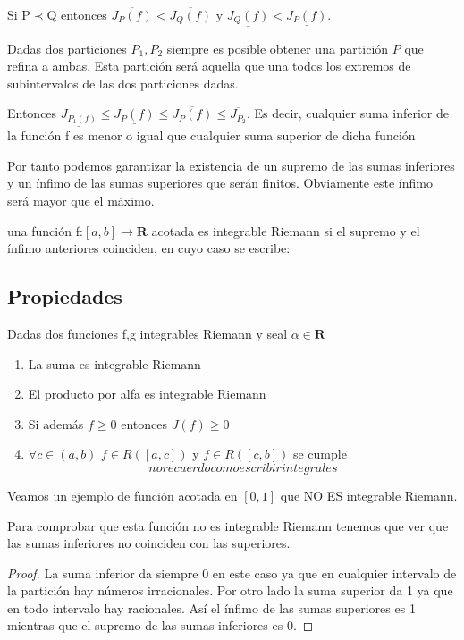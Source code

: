 \documentclass{apuntes}
\begin{document}
Si P$\prec$Q entonces $\overline{J_P(f)} < \overline{J_Q(f)}$  y $\underline{J_Q(f)} < \underline{J_P(f)}$.

Dadas dos particiones $P_1,P_2$ siempre es posible obtener una partición $P$ que refina a ambas. Esta partición será aquella que una todos los extremos de subintervalos de las dos particiones dadas.

Entonces $\underline{J_{P_1(f)}} \leq \underline{J_P(f)} \leq \overline{J_P(f)} \leq \overline{J_{P_2}}$. Es decir, cualquier suma inferior de la función f es menor o igual que cualquier suma superior de dicha función

Por tanto podemos garantizar la existencia de un supremo de las sumas inferiores y un ínfimo de las sumas superiores que serán finitos. Obviamente este ínfimo será mayor que el máximo.

\begin{defn}
una función f:$[ a,b] \rightarrow \textbf{R}$ acotada es integrable Riemann si el supremo y el ínfimo anteriores coinciden, en cuyo caso se escribe:
\end{defn}

\subsection{Propiedades}
Dadas dos funciones f,g integrables Riemann y seal $\alpha \in \textbf{R}$
\begin{enumerate}
\item La suma es integrable Riemann
\item El producto por alfa es integrable Riemann
\item Si además $f\geq 0$ entonces $J(f)\geq 0$
\item $\forall c \in (a,b)$ $f\in R([a,c])$  y $f\in R([c,b])$ se cumple
\[no recuerdo como escribir integrales\]
\end{enumerate}

\begin{example}
Veamos un ejemplo de función acotada en $[ 0,1]$ que NO ES integrable Riemann.

Para comprobar que esta función no es integrable Riemann tenemos que ver que las sumas inferiores no coinciden con las superiores.

\begin{proof}
La suma inferior da siempre 0 en este caso ya que en cualquier intervalo de la partición hay números irracionales. Por otro lado la suma superior da 1 ya que en todo intervalo hay racionales. Así el ínfimo de las sumas superiores es 1 mientras que el supremo de las sumas inferiores es 0.
\end{proof}
\end{example}
\end{document}
